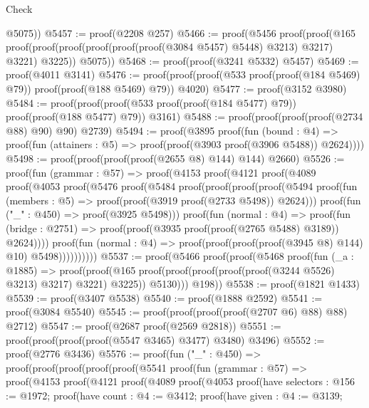 \begin{lexlean}{Check}
\begin{coremodule}
          @5075))
@5457 := proof(@2208 @257)
@5466 := proof(@5456
      proof(proof(@165
            proof(proof(proof(proof(proof(proof(@3084 @5457) @5448) @3213) @3217) @3221) @3225))
          @5075))
@5468 := proof(proof(@3241 @5332) @5457)
@5469 := proof(@4011 @3141)
@5476 := proof(proof(proof(@533 proof(proof(@184 @5469) @79)) proof(proof(@188 @5469) @79)) @4020)
@5477 := proof(@3152 @3980)
@5484 := proof(proof(proof(@533 proof(proof(@184 @5477) @79)) proof(proof(@188 @5477) @79)) @3161)
@5488 := proof(proof(proof(proof(@2734 @88) @90) @90) @2739)
@5494 := proof(@3895
      proof(fun (bound : @4) =>
        proof(fun (attainers : @5) => proof(proof(@3903 proof(@3906 @5488)) @2624))))
@5498 := proof(proof(proof(proof(@2655 @8) @144) @144) @2660)
@5526 := proof(fun (grammar : @57) =>
    proof(@4153
        proof(@4121
            proof(@4089
                proof(@4053
                    proof(@5476
                        proof(@5484
                            proof(proof(proof(proof(@5494
                                      proof(fun (members : @5) =>
                                        proof(proof(@3919 proof(@2733 @5498)) @2624)))
                                    proof(fun ("_" : @450) => proof(@3925 @5498)))
                                  proof(fun (normal : @4) =>
                                    proof(fun (bridge : @2751) =>
                                      proof(proof(@3935 proof(proof(@2765 @5488) @3189)) @2624))))
                                proof(fun (normal : @4) =>
                                  proof(proof(proof(proof(@3945 @8) @144) @10) @5498))))))))))
@5537 := proof(@5466
      proof(proof(@5468
            proof(fun (_a : @1885) =>
              proof(proof(@165
                    proof(proof(proof(proof(proof(@3244 @5526) @3213) @3217) @3221) @3225))
                  @5130)))
          @198))
@5538 := proof(@1821 @1433)
@5539 := proof(@3407 @5538)
@5540 := proof(@1888 @2592)
@5541 := proof(@3084 @5540)
@5545 := proof(proof(proof(proof(@2707 @6) @88) @88) @2712)
@5547 := proof(@2687 proof(@2569 @2818))
@5551 := proof(proof(proof(proof(@5547 @3465) @3477) @3480) @3496)
@5552 := proof(@2776 @3436)
@5576 := proof(fun ("_" : @450) =>
    proof(proof(proof(proof(proof(@5541
                proof(fun (grammar : @57) =>
                  proof(@4153
                      proof(@4121
                          proof(@4089
                              proof(@4053
                                  proof(have selectors : @156 := @1972;
                                    proof(have count : @4 := @3412;
                                      proof(have given : @4 := @3139;

\end{coremodule}
\end{lexlean}
